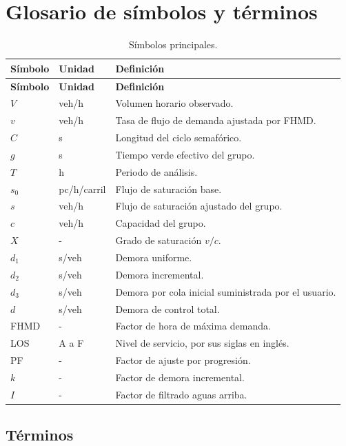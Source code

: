 \documentclass[11pt,letterpaper,oneside,openany]{report}
\begin{document}
\chapter{Glosario de símbolos y términos}

\begin{longtable}{@{}C{2.5cm}L{4.2cm}L{7.3cm}@{}}
\caption{Símbolos principales.}\label{tab:simbolos}\\
\toprule
{}
\textbf{Símbolo} & \textbf{Unidad} & \textbf{Definición} \\
\midrule
\endfirsthead
\toprule
{}
\textbf{Símbolo} & \textbf{Unidad} & \textbf{Definición} \\
\midrule
\endhead
$V$ & veh/h & Volumen horario observado. \\
$v$ & veh/h & Tasa de flujo de demanda ajustada por FHMD. \\
$C$ & s & Longitud del ciclo semafórico. \\
$g$ & s & Tiempo verde efectivo del grupo. \\
$T$ & h & Periodo de análisis. \\
$s_0$ & pc/h/carril & Flujo de saturación base. \\
$s$ & veh/h & Flujo de saturación ajustado del grupo. \\
$c$ & veh/h & Capacidad del grupo. \\
$X$ & - & Grado de saturación $v/c$. \\
$d_1$ & s/veh & Demora uniforme. \\
$d_2$ & s/veh & Demora incremental. \\
$d_3$ & s/veh & Demora por cola inicial suministrada por el usuario. \\
$d$ & s/veh & Demora de control total. \\
FHMD & - & Factor de hora de máxima demanda. \\
LOS & A a F & Nivel de servicio, por sus siglas en inglés. \\
PF & - & Factor de ajuste por progresión. \\
$k$ & - & Factor de demora incremental. \\
$I$ & - & Factor de filtrado aguas arriba. \\
\bottomrule
\end{longtable}

\section*{Términos}
\end{document}
